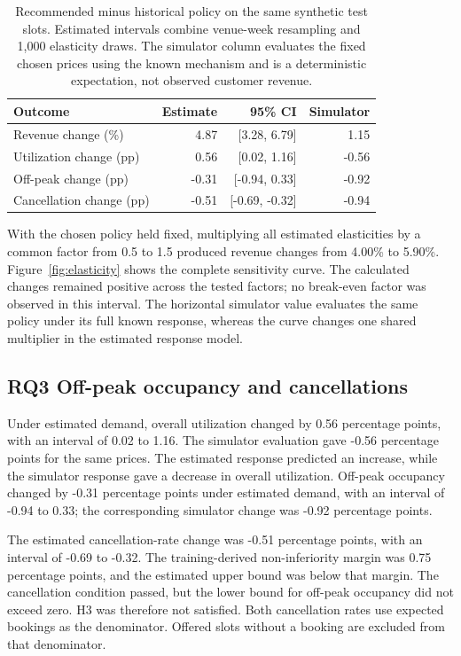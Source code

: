 \begin{table}[t]
\centering
\caption{Recommended minus historical policy on the same synthetic test slots. Estimated intervals combine venue-week resampling and 1,000 elasticity draws. The simulator column evaluates the fixed chosen prices using the known mechanism and is a deterministic expectation, not observed customer revenue.}
\label{tab:policy}
\footnotesize
\setlength{\tabcolsep}{3.5pt}
\begin{tabular}{lrrr}
\toprule
Outcome & Estimate & 95\% CI & Simulator \\
\midrule
Revenue change (\%) & 4.87 & [3.28, 6.79] & 1.15 \\
Utilization change (pp) & 0.56 & [0.02, 1.16] & -0.56 \\
Off-peak change (pp) & -0.31 & [-0.94, 0.33] & -0.92 \\
Cancellation change (pp) & -0.51 & [-0.69, -0.32] & -0.94 \\
\bottomrule
\end{tabular}
\end{table}

With the chosen policy held fixed, multiplying all estimated elasticities by a common factor from 0.5 to 1.5 produced revenue changes from 4.00\% to 5.90\%. Figure~\ref{fig:elasticity} shows the complete sensitivity curve. The calculated changes remained positive across the tested factors; no break-even factor was observed in this interval. The horizontal simulator value evaluates the same policy under its full known response, whereas the curve changes one shared multiplier in the estimated response model.

\subsection{RQ3 Off-peak occupancy and cancellations}
Under estimated demand, overall utilization changed by 0.56 percentage points, with an interval of 0.02 to 1.16. The simulator evaluation gave -0.56 percentage points for the same prices. The estimated response predicted an increase, while the simulator response gave a decrease in overall utilization. Off-peak occupancy changed by -0.31 percentage points under estimated demand, with an interval of -0.94 to 0.33; the corresponding simulator change was -0.92 percentage points.

The estimated cancellation-rate change was -0.51 percentage points, with an interval of -0.69 to -0.32. The training-derived non-inferiority margin was 0.75 percentage points, and the estimated upper bound was below that margin. The cancellation condition passed, but the lower bound for off-peak occupancy did not exceed zero. H3 was therefore not satisfied. Both cancellation rates use expected bookings as the denominator. Offered slots without a booking are excluded from that denominator.


